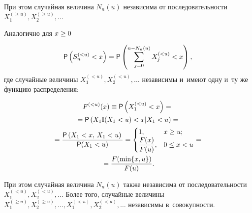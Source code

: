 \begin{multicols}{2}
\vspace*{-2pt}

\noindent
При этом случайная величина $N_n(u)$ независима от
последовательности $X_1^{(\ge u)},X_2^{(\ge u)},\ldots$

Аналогично для $x\hm\ge 0$

\vspace*{3pt}

\noindent
\begin{equation}
{\sf P}\left(S_n^{(<u)}<x\right)={\sf
P}\left(\sum\limits_{j=0}^{n-N_n(u)}X_j^{(<u)}<x\right),
\label{e2-kor}
\end{equation}
где случайные величины $X_1^{(<u)},X_2^{(<u)},\ldots$ 
независимы и~имеют одну и~ту же функцию распределения:

\noindent
\begin{multline*}
F^{(<u)}(x)\equiv {\sf P}\left(X_1^{(<u)}<x\right)={}\\
{}={\sf P}\left(X_1\mathbb{I}(X_1<u)<x|X_1<u\right)={}
\\
{}=\displaystyle\frac{\displaystyle {\sf P}\left(X_1<x,\,X_1<u\right)\mathstrut}{\displaystyle {\sf P}(X_1<u)\mathstrut}=
\begin{cases}
1, & x\ge u;\\
\displaystyle\displaystyle\frac{\displaystyle F(x)\mathstrut}{\displaystyle F(u)\mathstrut}, & 0\le x< u
\end{cases}={}\\
{}=
\displaystyle\frac{\displaystyle F(\min\{x,u\})\mathstrut}{\displaystyle F(u)\mathstrut}.
\end{multline*}


При этом случайная величина $N_n(u)$ также независима от
последовательности $X_1^{(<u)},X_2^{(<u)},\ldots$ Более того,
случайные величины $X_1^{(\ge u)},X_2^{(\ge
u)},\ldots,X_1^{(<u)},X_2^{(<u)},\ldots$ независимы в~совокупности.


\end{multicols}
